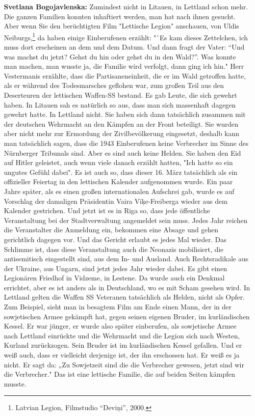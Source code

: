 \textbf{Svetlana Bogojavlenska:} Zumindest nicht in Litauen, in Lettland schon mehr. Die ganzen Familien konnten inhaftiert werden, man hat nach ihnen gesucht. Aber wenn Sie den berüchtigten Film "Lettische Legion" anschauen, von Uldis Neiburgs,\footnote{Latvian Legion, Filmstudio "`Deviņi"', 2000.} da haben einige Einberufenen erzählt: "`Es kam dieses Zettelchen, ich muss dort erscheinen an dem und dem Datum. Und dann fragt der Vater: "`Und was machst du jetzt? Gehst du hin oder gehst du in den Wald?"'. Was konnte man machen, man wusste ja, die Familie wird verfolgt, dann ging ich hin." Herr Vestermanis erzählte, dass die Partisaneneinheit, die er im Wald getroffen hatte, als er während des Todesmarsches geflohen war, zum großen Teil aus den Deserteuren der lettischen Waffen-SS bestand. Es gab Leute, die sich gewehrt haben. In Litauen sah es natürlich so aus, dass man sich massenhaft dagegen gewehrt hatte. In Lettland nicht. Sie haben sich dann tatsächlich zusammen mit der deutschen Wehrmacht an den Kämpfen an der Front beteiligt. Sie wurden aber nicht mehr zur Ermordung der Zivilbevölkerung eingesetzt, deshalb kann man tatsächlich sagen, dass die 1943 Einberufenen keine Verbrecher im Sinne des Nürnberger Tribunals sind. Aber es sind auch keine Helden. Sie haben den Eid auf Hitler geleistet, auch wenn viele danach erzählt hatten, "Ich hatte so ein ungutes Gefühl dabei". Es ist auch so, dass dieser 16. März tatsächlich als ein offizieller Feiertag in den lettischen Kalender aufgenommen wurde. Ein paar Jahre später, als es einen großen internationalen Aufschrei gab, wurde es auf Vorschlag der damaligen Präsidentin Vaira Vīķe-Freiberga wieder aus dem Kalender gestrichen. Und jetzt ist es in Riga so, dass jede öffentliche Veranstaltung bei der Stadtverwaltung angemeldet sein muss. Jedes Jahr reichen die Veranstalter die Anmeldung ein, bekommen eine Absage und gehen gerichtlich dagegen vor. Und das Gericht erlaubt es jedes Mal wieder. Das Schlimme ist, dass diese Veranstaltung auch die Neonazis mobilisiert, die antisemitisch eingestellt sind, aus dem In- und Ausland. Auch Rechtsradikale aus der Ukraine, aus Ungarn, sind jetzt jedes Jahr wieder dabei.
Es gibt einen Legionären Friedhof in Vidzeme, in Lestene. Da wurde auch ein Denkmal errichtet, aber es ist anders als in Deutschland, wo es mit Scham gesehen wird. In Lettland gelten die Waffen SS Veteranen tatsächlich als Helden, nicht als Opfer. Zum Beispiel, sieht man in besagtem Film am Ende einen Mann, der in der sowjetischen Armee gekämpft hat, gegen seinen eigenen Bruder, im kurländischen Kessel. Er war jünger, er wurde also später einberufen, als sowjetische Armee nach Lettland einrückte und die Wehrmacht und die Legion sich nach Westen, Kurland zurückzogen. Sein Bruder ist im kurländischen Kessel gefallen. Und er weiß auch, dass er vielleicht derjenige ist, der ihn erschossen hat. Er weiß es ja nicht. Er sagt da: „Zu Sowjetzeit sind die die Verbrecher gewesen, jetzt sind wir die Verbrecher." Das ist eine lettische Familie, die auf beiden Seiten kämpfen musste.
